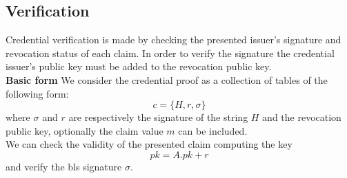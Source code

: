 \subsection{Verification}

Credential verification is made by checking the presented issuer's
signature and revocation status of each claim. In order to verify the signature the credential issuer's public key must
be added to the revocation public key.\\
\textbf{Basic form}
We consider the credential proof as a
collection of tables of the following form:
\begin{equation*}
    c = \{H, r, \sigma \}
\end{equation*}
where $\sigma$ and $r$ are respectively the signature of the string
$H$ and the revocation public key, optionally the claim value $m$ can be included.\\
We can check the validity of the
presented claim computing the key
\begin{equation*}
    pk = A.pk + r
\end{equation*}
and verify the bls signature $\sigma$.


